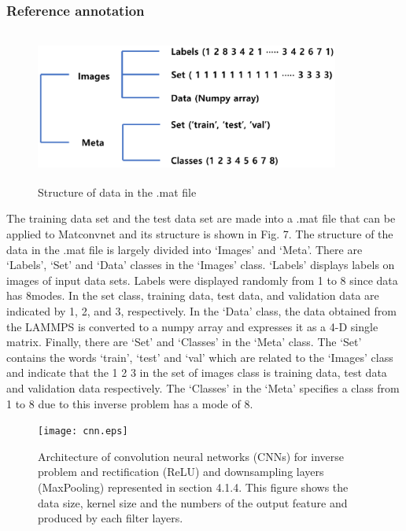 \subsubsection{Reference annotation}
\label{subsubsec2}

\begin{figure}
\includegraphics[width=10cm, height=5cm]{label.eps}
\caption{Structure of data in the .mat file}
\label{fig:4}       
\end{figure}
The training data set and the test data set are made into a .mat file that can be applied to Matconvnet and its structure is shown in Fig. 7. The structure of the data in the .mat file is largely divided into `Images' and `Meta'. There are `Labels', `Set' and `Data' classes in the `Images' class. `Labels' displays labels on images of input data sets. Labels were displayed randomly from 1 to 8 since data has 8modes. In the set class, training data, test data, and validation data are indicated by 1, 2, and 3, respectively. In the `Data' class, the data obtained from the LAMMPS is converted to a numpy array and expresses it as a 4-D single matrix. Finally, there are `Set' and `Classes' in the `Meta' class. The `Set' contains the words `train', `test' and `val' which are related to the `Images' class and indicate that the 1 2 3 in the set of images class is training data, test data and validation data respectively. The `Classes' in the `Meta' specifies a class from 1 to 8 due to this inverse problem has a mode of 8.
\begin{figure}
\texttt{[image: cnn.eps]}
\caption{Architecture of convolution neural networks (CNNs) for inverse problem and rectification (ReLU) and downsampling layers (MaxPooling) represented in section 4.1.4. This figure shows the data size, kernel size and the numbers of the output feature and produced by each filter layers.}
\label{fig:5}       
\end{figure}
